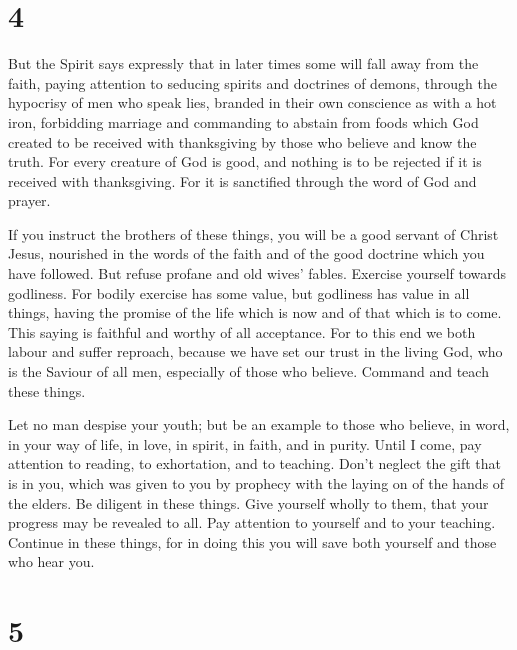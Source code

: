 \hypertarget{section-3}{%
\section{4}\label{section-3}}

 But the Spirit says expressly that in later times some
will fall away from the faith, paying attention to seducing spirits and
doctrines of demons,  through the hypocrisy of men who
speak lies, branded in their own conscience as with a hot iron,
 forbidding marriage and commanding to abstain from foods
which God created to be received with thanksgiving by those who believe
and know the truth.  For every creature of God is good,
and nothing is to be rejected if it is received with thanksgiving.
 For it is sanctified through the word of God and prayer.

 If you instruct the brothers of these things, you will be
a good servant of Christ Jesus, nourished in the words of the faith and
of the good doctrine which you have followed.  But refuse
profane and old wives' fables. Exercise yourself towards godliness.
 For bodily exercise has some value, but godliness has
value in all things, having the promise of the life which is now and of
that which is to come.  This saying is faithful and worthy
of all acceptance.  For to this end we both labour and
suffer reproach, because we have set our trust in the living God, who is
the Saviour of all men, especially of those who believe. 
Command and teach these things.

 Let no man despise your youth; but be an example to
those who believe, in word, in your way of life, in love, in spirit, in
faith, and in purity.  Until I come, pay attention to
reading, to exhortation, and to teaching.  Don't neglect
the gift that is in you, which was given to you by prophecy with the
laying on of the hands of the elders.  Be diligent in
these things. Give yourself wholly to them, that your progress may be
revealed to all.  Pay attention to yourself and to your
teaching. Continue in these things, for in doing this you will save both
yourself and those who hear you.

\hypertarget{section-4}{%
\section{5}\label{section-4}}

